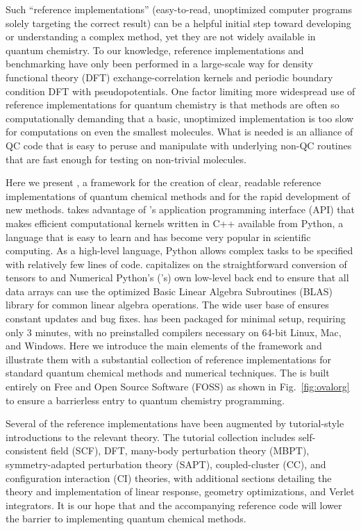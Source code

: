Such ``reference implementations'' (easy-to-read, unoptimized computer programs solely targeting the correct result) can be a helpful initial step toward developing or understanding a complex method, yet they are not widely available in quantum chemistry.  To our knowledge, reference implementations and benchmarking have only been performed in a large-scale way for density functional theory (DFT) exchange-correlation kernels\cite{CCL_DFT} and periodic boundary condition DFT with pseudopotentials.\cite{Lejaeghereaad3000} One factor limiting more widespread use of reference implementations for quantum chemistry is that methods are often so computationally demanding that a basic, unoptimized implementation is too slow for computations on even the smallest molecules.  What is needed is an alliance of QC code that is easy to peruse and manipulate with underlying non-QC routines that are fast enough for testing on non-trivial molecules.

Here we present \pfn, a framework for the creation of clear, readable reference implementations of quantum chemical methods and for the rapid development of new methods. \pfn takes advantage of \pfour's\cite{Psi41.1} application programming interface (API) that makes efficient computational kernels written in C++ available from Python, a language that is easy to learn and has become very popular in scientific computing.  As a high-level language, Python allows complex tasks to be specified with relatively few lines of code.  \pfn capitalizes on the straightforward conversion of \pfour tensors to \numpy\cite{Varoquaux:1521-9615} and Numerical Python's (\numpy's) own low-level back end to ensure that all data arrays can use the optimized Basic Linear Algebra Subroutines (BLAS) library\cite{BLAS} for common linear algebra operations. The wide user base of \numpy ensures constant updates and bug fixes. \pfn has been packaged for minimal setup, requiring only 3 minutes, with no preinstalled compilers necessary on 64-bit Linux, Mac, and Windows.  Here we introduce the main elements of the \pfn framework and illustrate them with a substantial collection of reference implementations for standard quantum chemical methods and numerical techniques. The \pfn is built entirely on Free and Open Source Software (FOSS)\cite{FOSS} as shown in Fig.~\ref{fig:ovalorg} to ensure a barrierless entry to quantum chemistry programming.

Several of the reference implementations have been augmented by tutorial-style introductions to the relevant theory.  The \pfn tutorial collection includes self-consistent field (SCF), DFT,\cite{Parr:1989} many-body perturbation theory (MBPT),\cite{Bartlett:1981:359} symmetry-adapted perturbation theory (SAPT)\cite{Jeziorski:1994:1887, Szalewicz:2012:254}, coupled-cluster (CC)\cite{Purvis:1982}, and configuration interaction (CI)\cite{Shavitt:1977,Sherrill:1999:CI} theories, with additional sections detailing the theory and implementation of linear response, geometry optimizations, and Verlet integrators.  It is our hope that \pfn and the accompanying reference code will lower the barrier to implementing quantum chemical methods.

